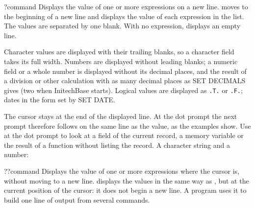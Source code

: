 
\begin{XbaseEntry}{?}{command}
Displays the value of one or more expressions on a new line.
\Syntax
{}
\Usage
{} moves to the beginning of a new line and displays the value of each
expression in the list.  The values are separated by one blank.  With no
expression,  displays an empty line.

Character values are displayed with their trailing blanks, so a character
field takes its full width.  Numbers are displayed without leading blanks;
a numeric field or a whole number is displayed without its decimal places,
and the result of a division or other calculation with as many decimal places
as SET DECIMALS gives (two when InitechBase starts).  Logical values are
displayed as \texttt{.T.} or \texttt{.F.}; dates in the form set by SET DATE.

The cursor stays at the end of the displayed line.  At the dot prompt the next
prompt therefore follows on the same line as the value, as the examples show.
\Tips
Use  at the dot prompt to look at a field of the current record, a
memory variable or the result of a function without listing the record.
\Examples
{}
A character string and a number:
\end{XbaseEntry}

\begin{XbaseEntry}{??}{command}
Displays the value of one or more expressions where the cursor is, without
moving to a new line.
\Syntax
{}
\Usage
{} displays the values in the same way as , but at the current
position of the cursor: it does not begin a new line.  A program uses it to
build one line of output from several commands.
\Examples
{}
\end{XbaseEntry}

